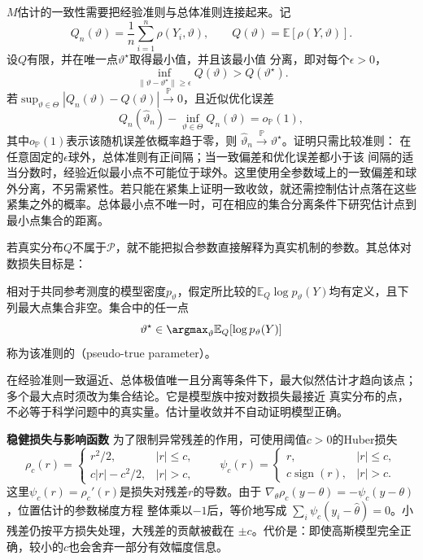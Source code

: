 \(M\)估计的一致性需要把经验准则与总体准则连接起来。记
\[
  Q_n(\vartheta)=\frac1n\sum_{i=1}^n\rho(Y_i,\vartheta),
  \qquad
  Q(\vartheta)=\mathbb{E}[\rho(Y,\vartheta)].
\]
设\(Q\)有限，并在唯一点\(\vartheta^\star\)取得最小值，并且该最小值
分离，即对每个\(\epsilon>0\)，
\[
  \inf_{\lVert\vartheta-\vartheta^\star\rVert\geq\epsilon}
  Q(\vartheta)>Q(\vartheta^\star).
\]
若\(\sup_{\vartheta\in\Theta}|Q_n(\vartheta)-Q(\vartheta)|
\xrightarrow{\mathbb{P}}0\)，且近似优化误差
\[
  Q_n(\widehat\vartheta_n)-\inf_{\vartheta\in\Theta}Q_n(\vartheta)
  =o_{\mathbb{P}}(1),
\]
其中\(o_{\mathbb{P}}(1)\)表示该随机误差依概率趋于零，则
\(\widehat\vartheta_n\xrightarrow{\mathbb{P}}\vartheta^\star\)。证明只需比较准则：
在任意固定的\(\epsilon\)球外，总体准则有正间隔；当一致偏差和优化误差都小于该
间隔的适当分数时，经验近似最小点不可能位于球外。这里使用全参数域上的一致偏差和球外分离，不另需紧性。若只能在紧集上证明一致收敛，就还需控制估计点落在这些紧集之外的概率。总体最小点不唯一时，可在相应的集合分离条件下研究估计点到最小点集合的距离。

若真实分布\(Q\)不属于\(\mathcal P\)，就不能把拟合参数直接解释为真实机制的参数。其总体对数损失目标是：
\begin{definition}[伪真参数]
  \label{def:statistics-pseudo-true-parameter}
相对于共同参考测度的模型密度\(p_\vartheta\)，假定所比较的\(\mathbb E_Q\log p_\vartheta(Y)\)均有定义，且下列最大点集合非空。集合中的任一点
\[
  \vartheta^\star
  \in\argmax_\vartheta\mathbb{E}_Q[\log p_\vartheta(Y)]
\]
称为该准则的（pseudo-true parameter）。
\end{definition}
在经验准则一致逼近、总体极值唯一且分离等条件下，最大似然估计才趋向该点；多个最大点时须改为集合结论。它是模型族中按对数损失最接近
真实分布的点，不必等于科学问题中的真实量。估计量收敛并不自动证明模型正确。

\par\medskip\noindent\textbf{稳健损失与影响函数}\quad
为了限制异常残差的作用，可使用阈值\(c>0\)的Huber损失
\[
  \rho_c(r)=
  \begin{cases}
    r^2/2,& |r|\leq c,\\
    c|r|-c^2/2,& |r|>c,
  \end{cases}
  \qquad
  \psi_c(r)=
  \begin{cases}
    r,& |r|\leq c,\\
    c\operatorname{sign}(r),& |r|>c.
  \end{cases}
\]
这里\(\psi_c(r)=\rho_c'(r)\)是损失对残差\(r\)的导数。由于
\(\nabla_\theta\rho_c(y-\theta)=-\psi_c(y-\theta)\)，位置估计的参数梯度方程
整体乘以\(-1\)后，等价地写成
\(\sum_i\psi_c(y_i-\widehat\theta)=0\)。小残差仍按平方损失处理，大残差的贡献被截在
\(\pm c\)。代价是：即使高斯模型完全正确，较小的\(c\)也会舍弃一部分有效幅度信息。

